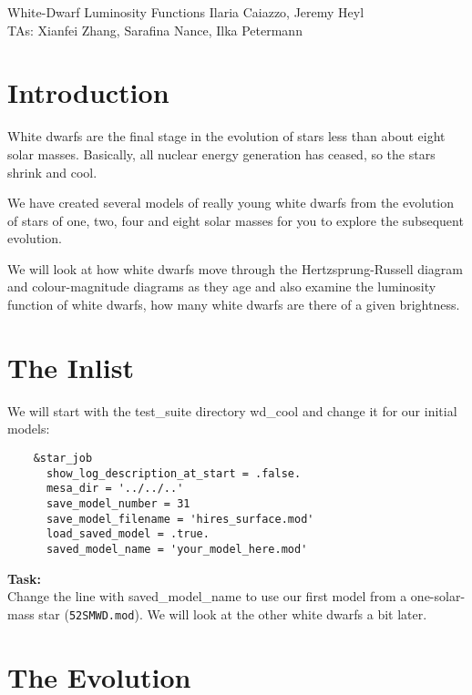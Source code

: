 \documentclass{article}
\begin{document}
\begin{titlebox}{White-Dwarf Luminosity Functions}
Ilaria Caiazzo, Jeremy Heyl \\
TAs: Xianfei Zhang, Sarafina Nance, Ilka Petermann
\end{titlebox}

\section{Introduction}

White dwarfs are the final stage in the evolution of stars less than about eight solar masses.  Basically, all nuclear energy generation has ceased, so the stars shrink and cool.  

We have created several models of really young white dwarfs from the evolution of stars of one, two, four and eight solar masses for you to explore the subsequent evolution.

We will look at how white dwarfs move through the Hertzsprung-Russell diagram and colour-magnitude diagrams as they age and also examine the luminosity function of white dwarfs, how many white dwarfs are there of a given brightness.

\section{The Inlist}

We will start with the test\_suite directory wd\_cool and change it for our initial models: 
\begin{verbatim}
    &star_job
      show_log_description_at_start = .false.
      mesa_dir = '../../..'
      save_model_number = 31
      save_model_filename = 'hires_surface.mod'
      load_saved_model = .true.
      saved_model_name = 'your_model_here.mod'
\end{verbatim}


\textbf{Task:} \\ 
Change the line with saved\_model\_name to use our first model from a one-solar-mass star (\texttt{52SMWD.mod}).  We will look at the other white dwarfs a bit later.

\section{The Evolution}
\end{document}

